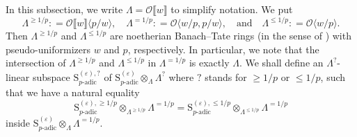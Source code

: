 \documentclass[12pt]{amsart}
\theoremstyle{definition}
\numberwithin{equation}{subsection}
\def\calO{\mathcal{O}}
\def\rmS{\mathrm{S}}
\begin{document}
In this subsection, we write $\Lambda= \calO\llbracket w \rrbracket$ to simplify notation. We put
\[
\Lambda^{\geq 1/p}: = \calO\llbracket w \rrbracket\langle p/w\rangle, \quad \Lambda^ {=1/p} : = \calO\langle w/p, p/w \rangle, \quad \textrm{and} \quad \Lambda^{\leq 1/p}: = \calO\langle w/p\rangle.
\]
Then $\Lambda^{\geq 1/p}$ and $\Lambda^{\leq 1/p}$ are noetherian Banach--Tate rings (in the sense of \cite[Annexe B]{AIP}) with pseudo-uniformizers $w$ and $p$, respectively.
In particular, we note that the intersection of $\Lambda^{\geq 1/p}$ and $\Lambda^{\leq 1/p}$ in $\Lambda^{=1/p}$ is exactly $\Lambda$.
We shall define
an $\Lambda^?$-linear subspace $\rmS_{p\textrm{-adic}}^{(\varepsilon), ?}$ of $ \rmS_{p\textrm{-adic}}^{(\varepsilon)} \otimes_{\Lambda} \Lambda^? $ where $?$ stands for $\geq 1/p$ or $\leq 1/p$, such that we have a natural equality
\begin{equation}
\label{E:Mvarepsilon gluing}
\rmS_{p\textrm{-adic}}^{(\varepsilon),\geq 1/p} \otimes_{\Lambda^{\geq 1/p}} \Lambda^{=1/p}  = \rmS_{p\textrm{-adic}}^{(\varepsilon),\leq 1/p} \otimes_{\Lambda^{\leq 1/p}} \Lambda^{=1/p}
\end{equation}
inside $\rmS_{p\textrm{-adic}}^{(\varepsilon)} \otimes_\Lambda \Lambda^{=1/p}$.
\end{document}
